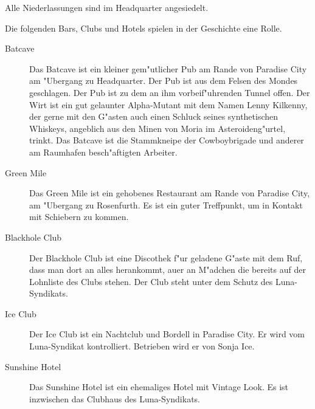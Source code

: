 Alle Niederlassungen sind im Headquarter angesiedelt.


Die folgenden Bars, Clubs und Hotels spielen in der Geschichte eine Rolle.

\begin{description}
    \item [Batcave] Das Batcave ist ein kleiner gem"utlicher Pub am Rande von Paradise City am "Ubergang zu Headquarter. Der Pub ist aus 
        dem Felsen des Mondes geschlagen. Der Pub ist zu dem an ihm vorbeif"uhrenden Tunnel offen. Der Wirt ist ein gut gelaunter Alpha-Mutant mit dem Namen Lenny Kilkenny, der gerne mit den G"asten auch einen Schluck seines synthetischen Whiskeys, angeblich aus den Minen von Moria im Asteroideng"urtel, trinkt. Das Batcave ist die Stammkneipe der Cowboybrigade und anderer am Raumhafen besch"aftigten Arbeiter.
    \item [Green Mile] Das Green Mile ist ein gehobenes Restaurant am Rande von Paradise City, am "Ubergang zu Rosenfurth.  Es ist ein 
        guter Treffpunkt, um in Kontakt mit Schiebern zu kommen.
    \item [Blackhole Club] Der Blackhole Club ist eine Discothek f"ur geladene G"aste mit dem Ruf, dass man dort an alles herankommt, au\3er 
        an M"adchen die bereits auf der Lohnliste des Clubs stehen. Der Club steht unter dem Schutz des Luna-Syndikats.    
    \item [Ice Club] Der Ice Club ist ein Nachtclub und Bordell in Paradise City. Er wird vom Luna-Syndikat kontrolliert. Betrieben wird 
        er von Sonja Ice.
    \item [Sunshine Hotel] Das Sunshine Hotel ist ein ehemaliges Hotel mit Vintage Look. Es ist inzwischen das Clubhaus des 
        Luna-Syndikats.    
\end{description}
